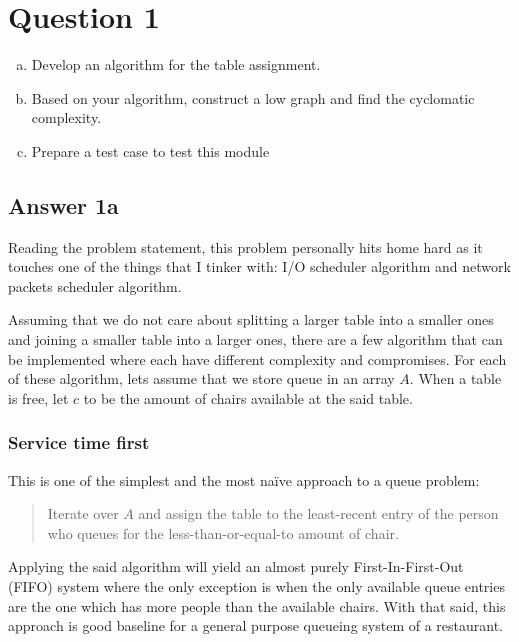 \documentclass[
  11pt, %
]{assignment}
\begin{document}
\section*{Question 1}

\begin{problem}
\begin{enumerate}[a.]
  \item Develop an algorithm for the table assignment.
  \item Based on your algorithm, construct a low graph and find the cyclomatic complexity.
  \item Prepare a test case to test this module
\end{enumerate}
\end{problem}

\subsection*{Answer 1a}

Reading the problem statement, this problem personally hits home hard as it touches one of the things that I tinker with: I/O scheduler algorithm and network packets scheduler algorithm.

Assuming that we do not care about splitting a larger table into a smaller ones and joining a smaller table into a larger ones, there are a few algorithm that can be implemented where each have different complexity and compromises. For each of these algorithm, lets assume that we store queue in an array \(A\). When a table is free, let \(c\) to be the amount of chairs available at the said table.

\subsubsection*{Service time first}

This is one of the simplest and the most naïve approach to a queue problem:

\begin{quote}
  Iterate over \(A\) and assign the table to the least-recent entry of the person who queues for the less-than-or-equal-to amount of chair.
\end{quote}

Applying the said algorithm will yield an almost purely First-In-First-Out (FIFO) system where the only exception is when the only available queue entries are the one which has more people than the available chairs. With that said, this approach is good baseline for a general purpose queueing system of a restaurant.
\end{document}
